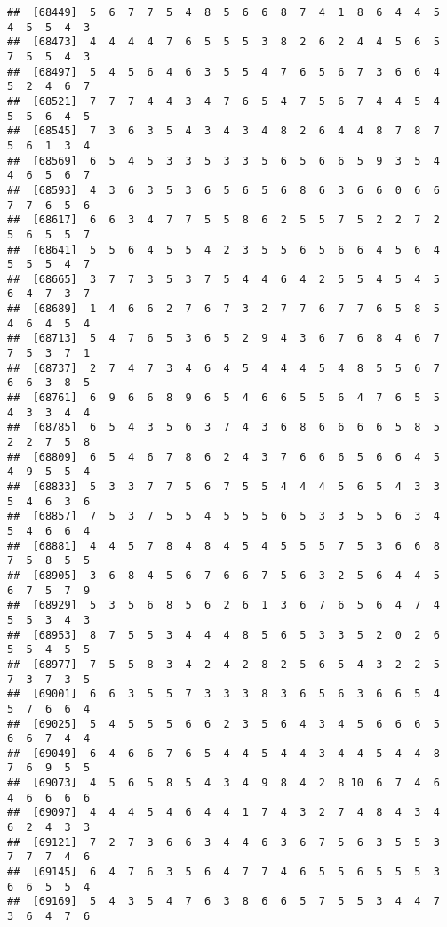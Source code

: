 \documentclass[
]{book}
\begin{document}
\begin{verbatim}
##  [68449]  5  6  7  7  5  4  8  5  6  6  8  7  4  1  8  6  4  4  5  4  5  5  4  3
##  [68473]  4  4  4  4  7  6  5  5  5  3  8  2  6  2  4  4  5  6  5  7  5  5  4  3
##  [68497]  5  4  5  6  4  6  3  5  5  4  7  6  5  6  7  3  6  6  4  5  2  4  6  7
##  [68521]  7  7  7  4  4  3  4  7  6  5  4  7  5  6  7  4  4  5  4  5  5  6  4  5
##  [68545]  7  3  6  3  5  4  3  4  3  4  8  2  6  4  4  8  7  8  7  5  6  1  3  4
##  [68569]  6  5  4  5  3  3  5  3  3  5  6  5  6  6  5  9  3  5  4  4  6  5  6  7
##  [68593]  4  3  6  3  5  3  6  5  6  5  6  8  6  3  6  6  0  6  6  7  7  6  5  6
##  [68617]  6  6  3  4  7  7  5  5  8  6  2  5  5  7  5  2  2  7  2  5  6  5  5  7
##  [68641]  5  5  6  4  5  5  4  2  3  5  5  6  5  6  6  4  5  6  4  5  5  5  4  7
##  [68665]  3  7  7  3  5  3  7  5  4  4  6  4  2  5  5  4  5  4  5  6  4  7  3  7
##  [68689]  1  4  6  6  2  7  6  7  3  2  7  7  6  7  7  6  5  8  5  4  6  4  5  4
##  [68713]  5  4  7  6  5  3  6  5  2  9  4  3  6  7  6  8  4  6  7  7  5  3  7  1
##  [68737]  2  7  4  7  3  4  6  4  5  4  4  4  5  4  8  5  5  6  7  6  6  3  8  5
##  [68761]  6  9  6  6  8  9  6  5  4  6  6  5  5  6  4  7  6  5  5  4  3  3  4  4
##  [68785]  6  5  4  3  5  6  3  7  4  3  6  8  6  6  6  6  5  8  5  2  2  7  5  8
##  [68809]  6  5  4  6  7  8  6  2  4  3  7  6  6  6  5  6  6  4  5  4  9  5  5  4
##  [68833]  5  3  3  7  7  5  6  7  5  5  4  4  4  5  6  5  4  3  3  5  4  6  3  6
##  [68857]  7  5  3  7  5  5  4  5  5  5  6  5  3  3  5  5  6  3  4  5  4  6  6  4
##  [68881]  4  4  5  7  8  4  8  4  5  4  5  5  5  7  5  3  6  6  8  7  5  8  5  5
##  [68905]  3  6  8  4  5  6  7  6  6  7  5  6  3  2  5  6  4  4  5  6  7  5  7  9
##  [68929]  5  3  5  6  8  5  6  2  6  1  3  6  7  6  5  6  4  7  4  5  5  3  4  3
##  [68953]  8  7  5  5  3  4  4  4  8  5  6  5  3  3  5  2  0  2  6  5  5  4  5  5
##  [68977]  7  5  5  8  3  4  2  4  2  8  2  5  6  5  4  3  2  2  5  7  3  7  3  5
##  [69001]  6  6  3  5  5  7  3  3  3  8  3  6  5  6  3  6  6  5  4  5  7  6  6  4
##  [69025]  5  4  5  5  5  6  6  2  3  5  6  4  3  4  5  6  6  6  5  6  6  7  4  4
##  [69049]  6  4  6  6  7  6  5  4  4  5  4  4  3  4  4  5  4  4  8  7  6  9  5  5
##  [69073]  4  5  6  5  8  5  4  3  4  9  8  4  2  8 10  6  7  4  6  4  6  6  6  6
##  [69097]  4  4  4  5  4  6  4  4  1  7  4  3  2  7  4  8  4  3  4  6  2  4  3  3
##  [69121]  7  2  7  3  6  6  3  4  4  6  3  6  7  5  6  3  5  5  3  7  7  7  4  6
##  [69145]  6  4  7  6  3  5  6  4  7  7  4  6  5  5  6  5  5  5  3  6  6  5  5  4
##  [69169]  5  4  3  5  4  7  6  3  8  6  6  5  7  5  5  3  4  4  7  3  6  4  7  6

\end{verbatim}
\end{document}
